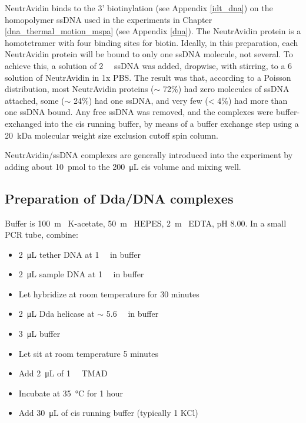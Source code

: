 NeutrAvidin binds to the 3' biotinylation (see Appendix \ref{idt_dna}) on the homopolymer ssDNA used in the experiments in Chapter \ref{dna_thermal_motion_mspa} (see Appendix \ref{dna}).  The NeutrAvidin protein is a homotetramer with four binding sites for biotin.  Ideally, in this preparation, each NeutrAvidin protein will be bound to only one ssDNA molecule, not several.  To achieve this, a solution of \SI{2}{\micro\Molar} ssDNA was added, dropwise, with stirring, to a \SI{6}{\micro\Molar} solution of NeutrAvidin in \num{1}x PBS.  The result was that, according to a Poisson distribution, most NeutrAvidin proteins ($\sim$ \num{72}\%) had zero molecules of ssDNA attached, some ($\sim$ \num{24}\%) had one ssDNA, and very few (< \num{4}\%) had more than one ssDNA bound.  Any free ssDNA was removed, and the complexes were buffer-exchanged into the cis running buffer, by means of a buffer exchange step using a \SI{20}{\kilo\dalton} molecular weight size exclusion cutoff spin column.

NeutrAvidin/ssDNA complexes are generally introduced into the experiment by adding about \SI{10}{\pico\mol} to the \SI{200}{\micro\liter} cis volume and mixing well.

\subsection{Preparation of Dda/DNA complexes}

Buffer is \SI{100}{\m\Molar} K-acetate, \SI{50}{\m\Molar} HEPES, \SI{2}{\m\Molar} EDTA, pH \num{8.00}.  In a small PCR tube, combine:

\begin{itemize}
\item \SI{2}{\micro\liter} tether DNA at \SI{1}{\micro\Molar} in buffer
\item \SI{2}{\micro\liter} sample DNA at \SI{1}{\micro\Molar} in buffer
\item Let hybridize at room temperature for \num{30} minutes
\item \SI{2}{\micro\liter} Dda helicase at $\sim$ \SI{5.6}{\micro\Molar} in buffer
\item \SI{3}{\micro\liter} buffer
\item Let sit at room temperature \num{5} minutes
\item Add \SI{2}{\micro\liter} of \SI{1}{\milli\Molar} TMAD
\item Incubate at \SI{35}{\celsius} for \num{1} hour
\item Add \SI{30}{\micro\liter} of cis running buffer (typically \SI{1}{\Molar} KCl)
\end{itemize}